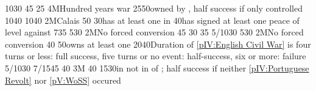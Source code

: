  
%
%
{10}{30}{\EU@objEcosseVassal}%
%
%
{}{45}{\EU@objCalaisANG}%
%
%
{}{25}{\EU@objIndustrial}%
%
\EUobjective4M{Hundred years war}{}%
{25}{50}{\provinceGuyenne owned by \paysmajeurAngleterre, half success if only
  controlled}%
%
%
{10}{40}{\EU@objIrelandPacified}%
%
%
%
{10}{40}{\EU@objEcosseVassal}%
%
\EUobjective2M{Calais}{}%
{}{50}{\EU@objCalaisANG}%
%
%
{}{30}{\paysmajeurAngleterre has at least one \COL in \continentAmerica}%
%
%
{}{40}{\paysmajeurAngleterre has signed at least one peace of level 
  against \paysmajeurFrance}%
%
%
{7}{35}{\EU@objIrelandPacified}%
%
%
%
{5}{30}{\EU@objEcosseVassal}%
%
\EUobjective2M{No forced conversion}{}%
{}{45}{}%
%
%
{}{30}{\EU@objIndustrial}%
%
%
%
{}{35}{}%
%
%
{5/10}{30}{}%
%
%
%
{5}{30}{\EU@objEcosseVassal}%
%
\EUobjective2M{No forced conversion}{}%
{}{40}{}%
%
%
{}{50}{\paysmajeurAngleterre owns at least one }%
%
%
{20}{40}{Duration of \ref{pIV:English Civil War} is four turns or less: full
  success, five turns or no event: half-success, six or more: failure}%
%
%
{5/10}{30}{}%
%
%
%
{7/15}{45}{}%
%
%
{}{40}{}%
%
\EUobjective3M{}{}%
{}{40}{}%
%
%
{15}{30}{\paysPortugal in not in \ANNEXION of \paysmajeurEspagne;
  half success if neither \ref{pIV:Portuguese Revolt} nor \ref{pV:WoSS}
  occured}%
%
%
